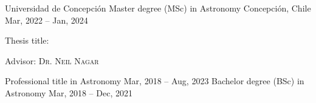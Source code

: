 
\begin{cventries}

  \cventry
    {Universidad de Concepción}
    {Master degree (MSc) in Astronomy}
    {Concepción, Chile}
    {Mar, 2022 -- Jan, 2024}
    {
      \begin{cvitems}
        \item{Thesis title: }
        \item{Advisor: \textsc{Dr. Neil Nagar}}
      \end{cvitems}
      \vspace{1em}
    }
  \cventryprevrole
    {Professional title in Astronomy}
    {Mar, 2018 -- Aug, 2023}
    {}
  \cventryprevrole
    {Bachelor degree (BSc) in Astronomy}
    {Mar, 2018 -- Dec, 2021}
    {}

    

\end{cventries}

